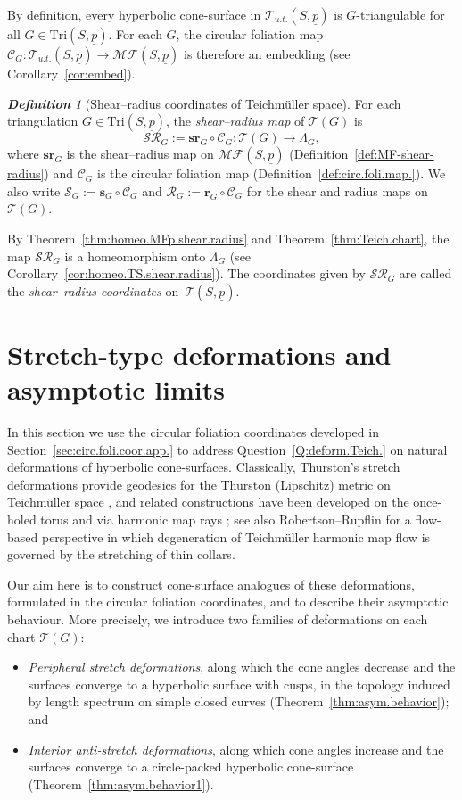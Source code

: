 \documentclass[11pt, letterpaper]{amsart}
\theoremstyle{definition}
\theoremstyle{remark}
\newtheorem{definition}[theorem]{\rm\bf Definition}
\newcommand{\up}{\underline{p}}
\newcommand{\Sp}{(S,\up)}
\newcommand{\TSp}{\text{Tri}\Sp}
\newcommand{\cMFp}{\mathcal{MF} (S,\up)}
\newcommand{\cC}{\mathcal{C}}
\newcommand{\cSR}{\mathcal{SR}}
\newcommand{\cR}{\mathcal{R}}
\newcommand{\cT}{\mathcal{T}}
\newcommand{\cTp}{\mathcal{T} (S,\up)}
\newcommand{\cS}{\mathcal{S}}
\newcommand{\DEF}{} \newcommand{\WARN}{\textcolor{red}} \newcommand{\ALT}{\textcolor{brown}} \newcommand{\TODO}{\textcolor{teal}} %
\numberwithin{equation}{section}
\begin{document}
By definition, every hyperbolic cone-surface in \(\cT_{u.t.}\Sp\) is
\(G\)-triangulable for all \(G\in\TSp\).
For each \(G\), the circular foliation map
\(\cC_G:\cT_{u.t.}(S,\up)\rightarrow \cMFp\) is therefore an embedding
(see Corollary~\ref{cor:embed}).

\begin{definition}[Shear--radius coordinates of Teichm\"uller space]
\label{def:shear-radius}
For each triangulation \(G\in\TSp\), the \DEF{\em shear--radius map} of \(\cT(G)\) is
\[
\cSR_G := \mathbf{sr}_G \circ \cC_G : \cT(G) \longrightarrow \Lambda_G,
\]
where \(\mathbf{sr}_G\) is the shear--radius map on \(\cMFp\)
(Definition~\ref{def:MF-shear-radius}) and \(\cC_G\) is the circular foliation
map (Definition~\ref{def:circ.foli.map.}).
We also write \(\cS_G := \mathbf{s}_G\circ\cC_G\) and
\(\cR_G := \mathbf{r}_G\circ\cC_G\) for the shear and radius maps on \(\cT(G)\).

By Theorem~\ref{thm:homeo.MFp.shear.radius} and Theorem~\ref{thm:Teich.chart},
the map \(\cSR_G\) is a homeomorphism onto \(\Lambda_G\)
(see Corollary~\ref{cor:homeo.TS.shear.radius}).
The coordinates given by \(\cSR_G\) are called the \DEF{\em shear--radius coordinates}
on~\(\cTp\).
\end{definition}





    
 \section{Stretch-type deformations and asymptotic limits}
\label{subsec:application}

In this section we use the circular foliation coordinates developed in Section~\ref{sec:circ.foli.coor.app.} to address Question~\ref{Q:deform.Teich.} on natural deformations of hyperbolic cone-surfaces.
Classically, Thurston's stretch deformations provide geodesics for the Thurston (Lipschitz) metric on Teichm\"uller space \cite{Thu98}, and related constructions have been developed on the once-holed torus \cite{HP21} and via harmonic map rays \cite{PW22}; see also Robertson--Rupflin \cite{RR20} for a flow-based perspective in which degeneration of Teichm\"uller harmonic map flow is governed by the stretching of thin collars.

Our aim here is to construct cone-surface analogues of these deformations, formulated in the circular foliation coordinates, and to describe their asymptotic behaviour. More precisely, we introduce two families of deformations on each chart \(\cT(G)\):
\begin{itemize}
  \item \emph{Peripheral stretch deformations}, along which the cone angles decrease and the surfaces converge to a hyperbolic surface with cusps, in the topology induced by length spectrum on simple closed curves (Theorem~\ref{thm:asym.behavior}); and
  \item \emph{Interior anti-stretch deformations}, along which cone angles increase and the surfaces converge to a circle-packed hyperbolic cone-surface (Theorem~\ref{thm:asym.behavior1}).
\end{itemize}
\end{document}

